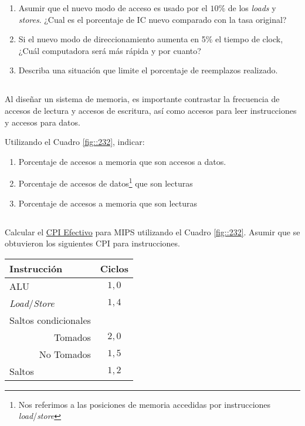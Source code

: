             \begin{enumerate}%
             \item Asumir que el nuevo modo de acceso es usado por el $10\%$ de los \textit{loads} y \textit{stores}. ¿Cual es el porcentaje de IC nuevo comparado con la tasa original?
            \item Si el nuevo modo de direccionamiento aumenta en 5\% el tiempo de clock, ¿Cuál
                   computadora será más rápida y por cuanto?
            \item Describa una situación que limite el porcentaje de reemplazos realizado.
            \end{enumerate}

\subsection{}
            Al diseñar un sistema de memoria, es importante contrastar la frecuencia de accesos de lectura y accesos de escritura, así como
            accesos para leer instrucciones y accesos para datos.

            Utilizando el Cuadro \ref{fig::232}, indicar: %
            \begin{enumerate}
            \item Porcentaje de accesos a memoria que son accesos a datos.
            \item Porcentaje de accesos de datos\footnote{Nos referimos a las posiciones de memoria accedidas por instrucciones \textit{load}/\textit{store}} que son lecturas  
            \item Porcentaje de accesos a memoria que son lecturas
            \end{enumerate}

\subsection{}
            Calcular el \underline{CPI Efectivo} para MIPS utilizando el Cuadro \ref{fig::232}. Asumir que se obtuvieron los siguientes CPI para instrucciones.

            \begin{center}
            \begin{tabular}{||l|c||}
            \hline
            Instrucción & Ciclos \\
            \hline
            ALU & $1,0$ \\\hline
            \textit{Load}/\textit{Store} & $1,4$ \\\hline
            Saltos condicionales & \\\hline
            \multicolumn{1}{||r|}{Tomados} & $2,0$ \\\hline
            \multicolumn{1}{||r|}{No Tomados} & $1,5$ \\\hline
            Saltos & $1,2$ \\\hline
            \end{tabular}
            \end{center}

